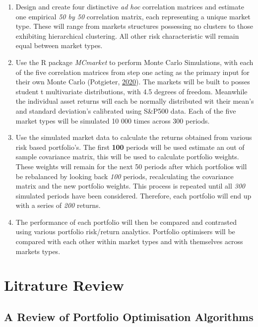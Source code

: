 \documentclass[11pt,preprint, authoryear]{elsarticle}
\numberwithin{equation}{section}
\numberwithin{figure}{section}
\numberwithin{table}{section}
\begin{document}
\begin{enumerate}
\def\labelenumi{\arabic{enumi}.}
\item
  Design and create four distinctive \emph{ad hoc} correlation matrices
  and estimate one empirical \emph{50 by 50} correlation matrix, each
  representing a unique market type. These will range from markets
  structures possessing no clusters to those exhibiting hierarchical
  clustering. All other risk characteristic will remain equal between
  market types.
\item
  Use the R package \emph{MCmarket} to perform Monte Carlo Simulations,
  with each of the five correlation matrices from step one acting as the
  primary input for their own Monte Carlo (Potgieter,
  \protect\hyperlink{ref-MCmarket}{2020}). The markets will be built to
  posses student t multivariate distributions, with 4.5 degrees of
  freedom. Meanwhile the individual asset returns will each be normally
  distributed wit their mean's and standard deviation's calibrated using
  S\&P500 data. Each of the five market types will be simulated 10 000
  times across 300 periods.
\item
  Use the simulated market data to calculate the returns obtained from
  various risk based portfolio's. The first \textbf{100} periods will be
  used estimate an out of sample covariance matrix, this will be used to
  calculate portfolio weights. These weights will remain for the next 50
  periods after which portfolios will be rebalanced by looking back
  \emph{100} periods, recalculating the covariance matrix and the new
  portfolio weights. This process is repeated until all \emph{300}
  simulated periods have been considered. Therefore, each portfolio will
  end up with a series of \emph{200} returns.
\item
  The performance of each portfolio will then be compared and contrasted
  using various portfolio risk/return analytics. Portfolio optimisers
  will be compared with each other within market types and with
  themselves across markets types.
\end{enumerate}

\hypertarget{litrature-review}{%
\section{\texorpdfstring{Litrature Review
\label{lit}}{Litrature Review }}\label{litrature-review}}

\hypertarget{a-review-of-portfolio-optimisation-algorithms}{%
\subsection{A Review of Portfolio Optimisation
Algorithms}\label{a-review-of-portfolio-optimisation-algorithms}}
\end{document}
